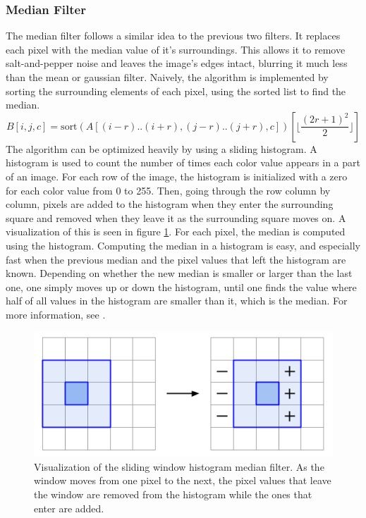 \documentclass[sigconf]{acmart}
\begin{document}
\subsubsection{Median Filter}
The median filter follows a similar idea to the previous two filters. It replaces each pixel with the median value of it's surroundings. This allows it to remove salt-and-pepper noise and leaves the image's edges intact, blurring it much less than the mean or gaussian filter. Naively, the algorithm is implemented by sorting the surrounding elements of each pixel, using the sorted list to find the median.
$$
B[i,j,c] = \text{sort}(A[(i-r)..(i+r), (j-r)..(j+r), c])[\lfloor\frac{(2r+1)^2}{2}\rfloor]
$$
The algorithm can be optimized heavily by using a sliding histogram. A histogram is used to count the number of times each color value appears in a part of an image. For each row of the image, the histogram is initialized with a zero for each color value from 0 to 255. Then, going through the row column by column, pixels are added to the histogram when they enter the surrounding square and removed when they leave it as the surrounding square moves on. A visualization of this is seen in figure \ref{fig:medianfilter}. For each pixel, the median is computed using the histogram. Computing the median in a histogram is easy, and especially fast when the previous median and the pixel values that left the histogram are known. Depending on whether the new median is smaller or larger than the last one, one simply moves up or down the histogram, until one finds the value where half of all values in the histogram are smaller than it, which is the median. For more information, see \cite{huang}.

\begin{figure}
  \centering
  \includegraphics[width=\linewidth]{./graphics/Medianfilter.png}
  \caption{Visualization of the sliding window histogram median filter. As the window moves from one pixel to the next, the pixel values that leave the window are removed from the histogram while the ones that enter are added.}
  \label{fig:medianfilter}
\end{figure}
\end{document}
